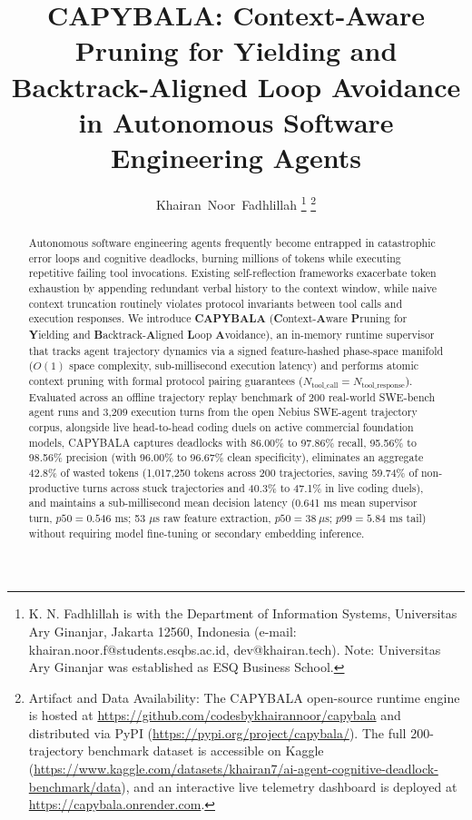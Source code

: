 \documentclass[journal]{IEEEtran}
\begin{document}
\flushbottom

\title{CAPYBALA: Context-Aware Pruning for Yielding and Backtrack-Aligned Loop Avoidance in Autonomous Software Engineering Agents}

\author{Khairan~Noor~Fadhlillah%
\thanks{K. N. Fadhlillah is with the Department of Information Systems, Universitas Ary Ginanjar, Jakarta 12560, Indonesia (e-mail: khairan.noor.f@students.esqbs.ac.id, dev@khairan.tech). Note: Universitas Ary Ginanjar was established as ESQ Business School.}%
\thanks{Artifact and Data Availability: The CAPYBALA open-source runtime engine is hosted at \url{https://github.com/codesbykhairannoor/capybala} and distributed via PyPI (\url{https://pypi.org/project/capybala/}). The full 200-trajectory benchmark dataset is accessible on Kaggle (\url{https://www.kaggle.com/datasets/khairan7/ai-agent-cognitive-deadlock-benchmark/data}), and an interactive live telemetry dashboard is deployed at \url{https://capybala.onrender.com}.}%
}

\maketitle

\begin{abstract}
Autonomous software engineering agents frequently become entrapped in catastrophic error loops and cognitive deadlocks, burning millions of tokens while executing repetitive failing tool invocations. Existing self-reflection frameworks exacerbate token exhaustion by appending redundant verbal history to the context window, while naive context truncation routinely violates protocol invariants between tool calls and execution responses. We introduce \textbf{CAPYBALA} (\textbf{C}ontext-\textbf{A}ware \textbf{P}runing for \textbf{Y}ielding and \textbf{B}acktrack-\textbf{A}ligned \textbf{L}oop \textbf{A}voidance), an in-memory runtime supervisor that tracks agent trajectory dynamics via a signed feature-hashed phase-space manifold ($O(1)$ space complexity, sub-millisecond execution latency) and performs atomic context pruning with formal protocol pairing guarantees ($N_{\text{tool\_call}} = N_{\text{tool\_response}}$). Evaluated across an offline trajectory replay benchmark of 200 real-world SWE-bench agent runs and 3,209 execution turns from the open Nebius SWE-agent trajectory corpus, alongside live head-to-head coding duels on active commercial foundation models, CAPYBALA captures deadlocks with 86.00\% to 97.86\% recall, 95.56\% to 98.56\% precision (with 96.00\% to 96.67\% clean specificity), eliminates an aggregate 42.8\% of wasted tokens (1,017,250 tokens across 200 trajectories, saving 59.74\% of non-productive turns across stuck trajectories and 40.3\% to 47.1\% in live coding duels), and maintains a sub-millisecond mean decision latency (0.641 ms mean supervisor turn, $p50 = 0.546\text{ ms}$; 53 $\mu$s raw feature extraction, $p50 = 38\ \mu\text{s}$; $p99 = 5.84\text{ ms}$ tail) without requiring model fine-tuning or secondary embedding inference.
\end{abstract}
\end{document}

